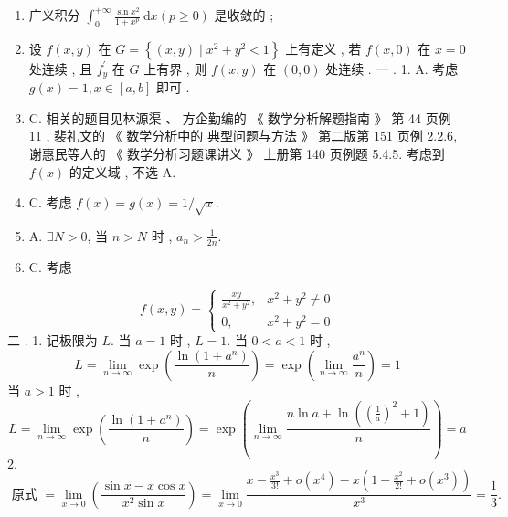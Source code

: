 \documentclass[10pt]{article}
\begin{document}
\begin{enumerate}
  \item  广义积分  $\int_{0}^{+\infty} \frac{\sin x^{2}}{1+x^{p}} \mathrm{~d} x(p \geqslant 0)$  是收敛的 ;

  \item  设  $f(x, y)$  在  $G=\left\{(x, y) \mid x^{2}+y^{2}<1\right\}$  上有定义 ,  若  $f(x, 0)$  在  $x=0$  处连续 ,  且  $f_{y}^{\prime}$  在  $G$  上有界 ,  则  $f(x, y)$  在  $(0,0)$  处连续 .  一 . 1. A.  考虑  $g(x)=1, x \in[a, b]$  即可 .

  \item C.  相关的题目见林源渠 、 方企勤编的 《 数学分析解题指南 》 第  44  页例  11 ,  裴礼文的 《 数学分析中的   典型问题与方法 》 第二版第  151  页例  $2.2 .6$,  谢惠民等人的 《 数学分析习题课讲义 》 上册第  140  页例题  5.4.5.  考虑到  $f(x)$  的定义域 ,  不选  A.

  \item C.  考虑  $f(x)=g(x)=1 / \sqrt{x}$.

  \item A. $\exists N>0$,  当  $n>N$  时 , $a_{n}>\frac{1}{2 n}$.

  \item C.  考虑 

\end{enumerate}
$$
f(x, y)= \begin{cases}\frac{x y}{x^{2}+y^{2}}, & x^{2}+y^{2} \neq 0 \\ 0, & x^{2}+y^{2}=0\end{cases}
$$
 二 . 1.  记极限为  $L$.  当  $a=1$  时 , $L=1$.  当  $0<a<1$  时 ,
$$
L=\lim _{n \rightarrow \infty} \exp \left(\frac{\ln \left(1+a^{n}\right)}{n}\right)=\exp \left(\lim _{n \rightarrow \infty} \frac{a^{n}}{n}\right)=1
$$
 当  $a>1$  时 ,
$$
L=\lim _{n \rightarrow \infty} \exp \left(\frac{\ln \left(1+a^{n}\right)}{n}\right)=\exp \left(\lim _{n \rightarrow \infty} \frac{n \ln a+\ln \left(\left(\frac{1}{a}\right)^{2}+1\right)}{n}\right)=a
$$
$2 .$
$$
\text { 原式 }=\lim _{x \rightarrow 0}\left(\frac{\sin x-x \cos x}{x^{2} \sin x}\right)=\lim _{x \rightarrow 0} \frac{x-\frac{x^{3}}{3 !}+o\left(x^{4}\right)-x\left(1-\frac{x^{2}}{2 !}+o\left(x^{3}\right)\right)}{x^{3}}=\frac{1}{3} \text {. }
$$
\end{document}

